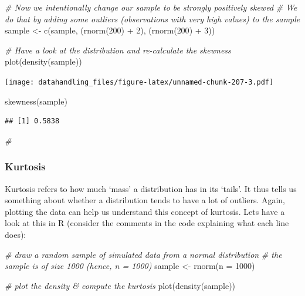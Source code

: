 \documentclass[
  12pt,
]{style/krantz}
\newenvironment{Shaded}{\begin{snugshade}}{\end{snugshade}}
\newcommand{\AttributeTok}[1]{\textcolor[rgb]{0.77,0.63,0.00}{#1}}
\newcommand{\CommentTok}[1]{\textcolor[rgb]{0.56,0.35,0.01}{\textit{#1}}}
\newcommand{\DecValTok}[1]{\textcolor[rgb]{0.00,0.00,0.81}{#1}}
\newcommand{\FunctionTok}[1]{\textcolor[rgb]{0.00,0.00,0.00}{#1}}
\newcommand{\NormalTok}[1]{#1}
\newcommand{\OtherTok}[1]{\textcolor[rgb]{0.56,0.35,0.01}{#1}}
\newcommand{\SpecialCharTok}[1]{\textcolor[rgb]{0.00,0.00,0.00}{#1}}
\begin{document}
\begin{Shaded}
\begin{Highlighting}[]
\CommentTok{\# Now we intentionally change our sample to be strongly positively skewed}
\CommentTok{\# We do that by adding some outliers (observations with very high values) to the sample }
\NormalTok{sample }\OtherTok{\textless{}{-}} \FunctionTok{c}\NormalTok{(sample, (}\FunctionTok{rnorm}\NormalTok{(}\DecValTok{200}\NormalTok{) }\SpecialCharTok{+} \DecValTok{2}\NormalTok{), (}\FunctionTok{rnorm}\NormalTok{(}\DecValTok{200}\NormalTok{) }\SpecialCharTok{+} \DecValTok{3}\NormalTok{))}

\CommentTok{\# Have a look at the distribution and re{-}calculate the skewness}
\FunctionTok{plot}\NormalTok{(}\FunctionTok{density}\NormalTok{(sample))}
\end{Highlighting}
\end{Shaded}

\texttt{[image: datahandling\_files/figure-latex/unnamed-chunk-207-3.pdf]}

\begin{Shaded}
\begin{Highlighting}[]
\FunctionTok{skewness}\NormalTok{(sample)}
\end{Highlighting}
\end{Shaded}

\begin{verbatim}
## [1] 0.5838
\end{verbatim}

\begin{Shaded}
\begin{Highlighting}[]
\CommentTok{\#}
\end{Highlighting}
\end{Shaded}

\hypertarget{kurtosis}{%
\subsubsection{Kurtosis}\label{kurtosis}}

Kurtosis refers to how much `mass' a distribution has in its `tails'. It thus tells us something about whether a distribution tends to have a lot of outliers. Again, plotting the data can help us understand this concept of kurtosis. Lets have a look at this in R (consider the comments in the code explaining what each line does):

\begin{Shaded}
\begin{Highlighting}[]
\CommentTok{\# draw a random sample of simulated data from a normal distribution}
\CommentTok{\# the sample is of size 1000 (hence, n = 1000)}
\NormalTok{sample }\OtherTok{\textless{}{-}} \FunctionTok{rnorm}\NormalTok{(}\AttributeTok{n =} \DecValTok{1000}\NormalTok{)}

\CommentTok{\# plot the density \& compute the kurtosis}
\FunctionTok{plot}\NormalTok{(}\FunctionTok{density}\NormalTok{(sample))}
\end{Highlighting}
\end{Shaded}
\end{document}
